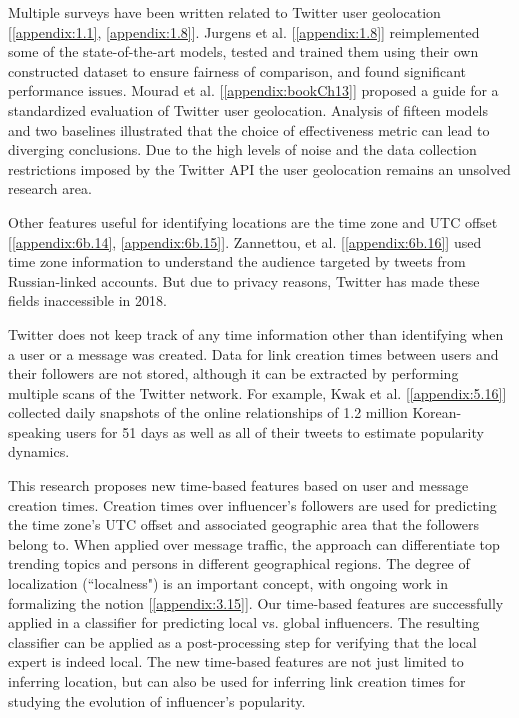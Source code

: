 Multiple surveys have been written related to Twitter user geolocation [\ref{appendix:1.1}, \ref{appendix:1.8}]. Jurgens et al. [\ref{appendix:1.8}] reimplemented some of the state-of-the-art models, tested and trained them using their own constructed dataset to ensure fairness of comparison, and found significant performance issues. Mourad et al. [\ref{appendix:bookCh13}] proposed a guide for a standardized evaluation of Twitter user geolocation. Analysis of ﬁfteen models and two baselines illustrated that the choice of effectiveness metric can lead to diverging conclusions. Due to the high levels of noise and the data collection restrictions imposed by the Twitter API the user geolocation remains an unsolved research area. 

Other features useful for identifying locations are the time zone and UTC offset [\ref{appendix:6b.14}, \ref{appendix:6b.15}]. Zannettou, et al. [\ref{appendix:6b.16}] used time zone information to understand the  audience targeted
by tweets from Russian-linked accounts. But due to privacy reasons, Twitter has made these fields inaccessible in 2018. 

\newcommand{\datetime}{time information }
Twitter does not keep track of any time information other than identifying when a user or a message was created. Data for link creation times between users and their followers are not stored, although it can be extracted by performing multiple scans of the Twitter network. For example, Kwak et al. [\ref{appendix:5.16}] collected daily snapshots of the online relationships of 1.2 million Korean-speaking users for 51 days as well as all of their tweets to estimate popularity dynamics.

This research proposes new time-based features based on user and message creation times. Creation times over influencer's followers are used for predicting the time zone's UTC offset and associated geographic area that the followers belong to. When applied over message traffic, the approach can differentiate top trending topics and persons in different geographical regions. The degree of localization (``localness") is %
an important concept, with ongoing work in formalizing the notion [\ref{appendix:3.15}]. Our time-based features are successfully applied in a classifier for predicting local vs. global influencers. The resulting classifier can be applied as a post-processing step for verifying that the local expert is indeed local. The new time-based features are not just limited to inferring location, but can also be used for inferring link creation times for studying the evolution of influencer's popularity.


